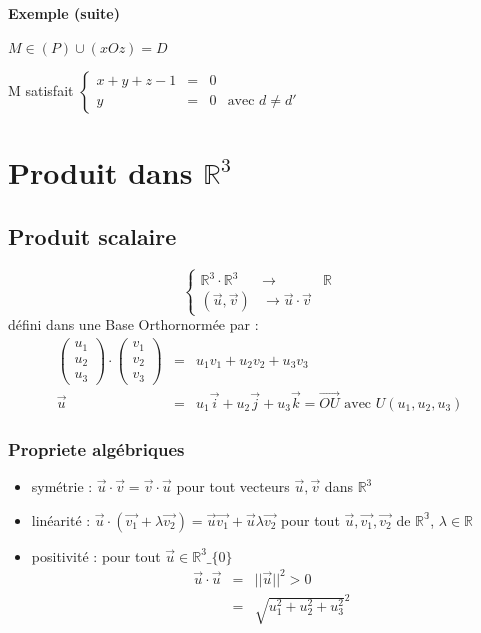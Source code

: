 \paragraph{Exemple (suite)}

$M \in (P) \cup (xOz) = D$

M satisfait $ \left\{\begin{array}{rcll}
	x + y + z -1 &=& 0 \\
	y &=& 0 & \text{avec } d \neq d'\end{array}\right.$

\section{Produit dans $\mathbb{R}^3$}

\subsection{Produit scalaire}

\[\left\{\begin{array}{rcl}
	\mathbb{R}^3 \cdot \mathbb{R}^3 &\rightarrow& \mathbb{R} \\
(\vec{u}, \vec{v}) &\rightarrow  \vec{u}\cdot \vec{v}\end{array}\right.\] défini dans une Base Orthornormée par :
\[\begin{array}{rcl}
	\begin{pmatrix}
		u_1 \\
		u_2 \\
		u_3\end{pmatrix} \cdot \begin{pmatrix}
		v_1 \\
		v_2 \\
		v_3\end{pmatrix} &=& u_1v_1 + u_2v_2 + u_3v_3 \\
		\vec{u} &=& u_1 \vec{i} + u_2 \vec{j} + u_3 \vec{k} = \vec{OU} \text{ avec } U(u_1, u_2, u_3)\end{array}\]

\subsubsection{Propriete algébriques}
	\begin{itemize}
		\item symétrie : $\vec{u}\cdot \vec{v} = \vec{v}\cdot\vec{u}$ pour tout vecteurs $\vec{u}, \vec{v}$ dans $\mathbb{R}^3$
		\item linéarité : $\vec{u}\cdot(\vec{v_1}+\lambda \vec{v_2}) = \vec{u}\vec{v_1} + \vec{u}\lambda\vec{v_2}$ pour tout $\vec{u}, \vec{v_1}, \vec{v_2}$ de $\mathbb{R^3}$, $\lambda \in \mathbb{R}$
		\item positivité : pour tout $\vec{u} \in \mathbb{R}^3\_{\{0\}}$
			\[\begin{array}{rcl}
					\vec{u}\cdot\vec{u} &=& ||\vec{u}||^2 > 0  \\
			&=& \sqrt{u_1^2 + u_2^2 + u_3^2}^2\end{array}\]
	\end{itemize}

